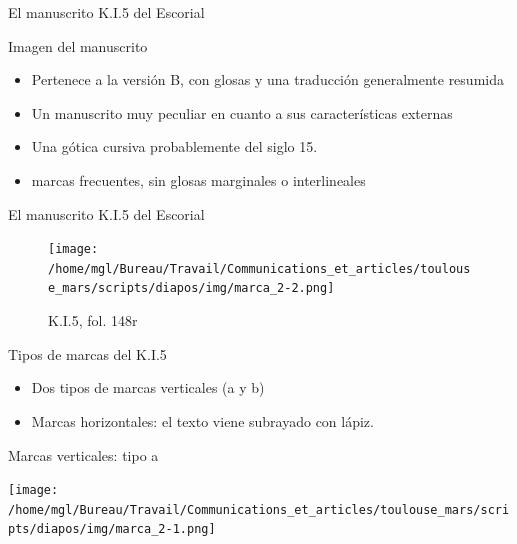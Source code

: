 \documentclass[11pt,aspectratio=169]{beamer}
\begin{document}
\begin{frame}{El manuscrito K.I.5 del Escorial}

Imagen del manuscrito

\begin{itemize}
\item Pertenece a la versión B, con glosas y una traducción generalmente resumida
\item Un manuscrito muy peculiar en cuanto a sus características externas
\item Una gótica cursiva probablemente del siglo 15. 
\item marcas frecuentes, sin glosas marginales o interlineales
\end{itemize}
\end{frame}


\begin{frame}{El manuscrito K.I.5 del Escorial}
\begin{figure}
\begin{center}
\texttt{[image: /home/mgl/Bureau/Travail/Communications\_et\_articles/toulouse\_mars/scripts/diapos/img/marca\_2-2.png]}
\caption{K.I.5, fol. 148r}
\end{center}
\end{figure}
\end{frame}





\begin{frame}{Tipos de marcas del K.I.5}
\begin{itemize}
\item Dos tipos de marcas verticales (a y b) 
\item Marcas horizontales: el texto viene subrayado con lápiz.
\end{itemize}
\end{frame}


\begin{frame}{Marcas verticales: tipo a}
\begin{center}
\texttt{[image: /home/mgl/Bureau/Travail/Communications\_et\_articles/toulouse\_mars/scripts/diapos/img/marca\_2-1.png]}
\end{center}
\end{frame}
\end{document}
